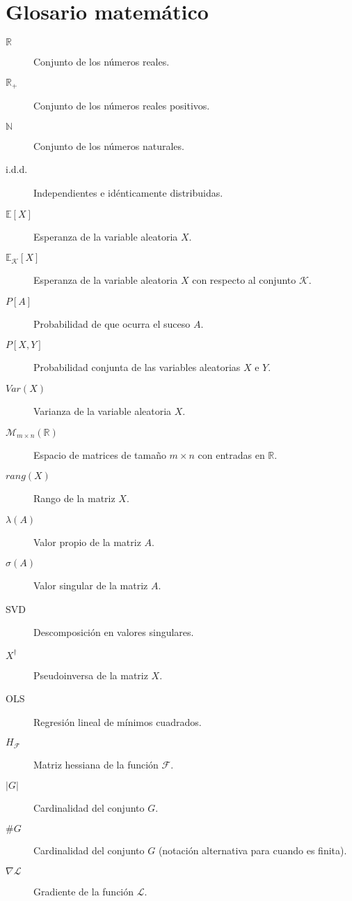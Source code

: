 
\chapter*{Glosario matemático}

\begin{description} 
  \item[$\mathbb{R}$] Conjunto de los números reales.
  \item[$\mathbb{R_{+}}$] Conjunto de los números reales positivos.
  \item[$\mathbb{N}$] Conjunto de los números naturales.
  \item[i.d.d.] Independientes e idénticamente distribuidas.
  \item[${\mathbb{E}[X]}$] Esperanza de la variable aleatoria $X$.
  \item[${\mathbb{E}_{\mathcal{K}}[X]}$] Esperanza de la variable aleatoria $X$ con respecto al conjunto $\mathcal{K}$.
  \item[${P[A]}$] Probabilidad de que ocurra el suceso $A$.
  \item[${P[X, Y]}$] Probabilidad conjunta de las variables aleatorias $X$ e $Y$.
  \item[$Var(X)$] Varianza de la variable aleatoria $X$.
  \item[$\mathcal{M}_{m \times n}(\mathbb{R})$] Espacio de matrices de tamaño $m \times n$ con entradas en $\mathbb{R}$.
  \item[$rang(X)$] Rango de la matriz $X$. 
  \item[$\lambda(A)$] Valor propio de la matriz $A$.
  \item[$\sigma(A)$] Valor singular de la matriz $A$.
  \item[SVD] Descomposición en valores singulares.
  \item[$X^{\dagger}$] Pseudoinversa de la matriz $X$.
  \item[OLS] Regresión lineal de mínimos cuadrados.
  \item[$H_{\mathcal{F}}$] Matriz hessiana de la función $\mathcal{F}$.
  \item[$|G|$] Cardinalidad del conjunto $G$.
  \item[$\#G$] Cardinalidad del conjunto $G$ (notación alternativa para cuando es finita).
  \item[$\nabla\mathcal{L}$] Gradiente de la función $\mathcal{L}$.

\end{description}
